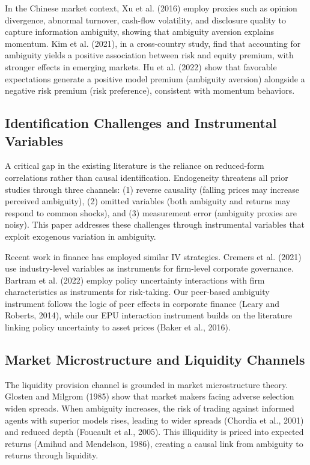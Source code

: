 \documentclass[preprint,12pt,authoryear]{elsarticle}
\begin{document}
In the Chinese market context, Xu et al. (2016) employ proxies such as opinion divergence, abnormal turnover, cash-flow volatility, and disclosure quality to capture information ambiguity, showing that ambiguity aversion explains momentum. Kim et al. (2021), in a cross-country study, find that accounting for ambiguity yields a positive association between risk and equity premium, with stronger effects in emerging markets. Hu et al. (2022) show that favorable expectations generate a positive model premium (ambiguity aversion) alongside a negative risk premium (risk preference), consistent with momentum behaviors.

\subsection{Identification Challenges and Instrumental Variables}

A critical gap in the existing literature is the reliance on reduced-form correlations rather than causal identification. Endogeneity threatens all prior studies through three channels: (1) reverse causality (falling prices may increase perceived ambiguity), (2) omitted variables (both ambiguity and returns may respond to common shocks), and (3) measurement error (ambiguity proxies are noisy). This paper addresses these challenges through instrumental variables that exploit exogenous variation in ambiguity.

Recent work in finance has employed similar IV strategies. Cremers et al. (2021) use industry-level variables as instruments for firm-level corporate governance. Bartram et al. (2022) employ policy uncertainty interactions with firm characteristics as instruments for risk-taking. Our peer-based ambiguity instrument follows the logic of peer effects in corporate finance (Leary and Roberts, 2014), while our EPU interaction instrument builds on the literature linking policy uncertainty to asset prices (Baker et al., 2016).

\subsection{Market Microstructure and Liquidity Channels}

The liquidity provision channel is grounded in market microstructure theory. Glosten and Milgrom (1985) show that market makers facing adverse selection widen spreads. When ambiguity increases, the risk of trading against informed agents with superior models rises, leading to wider spreads (Chordia et al., 2001) and reduced depth (Foucault et al., 2005). This illiquidity is priced into expected returns (Amihud and Mendelson, 1986), creating a causal link from ambiguity to returns through liquidity.
\end{document}
